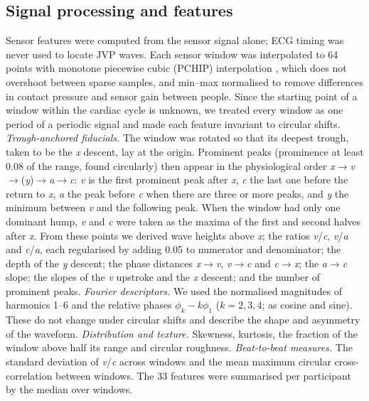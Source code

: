 \documentclass[11pt]{article}
\begin{document}
\subsection*{Signal processing and features}
Sensor features were computed from the sensor signal alone; ECG timing was never used to locate JVP waves. Each sensor window was interpolated to 64 points with monotone piecewise cubic (PCHIP) interpolation \cite{fritsch1980monotone}, which does not overshoot between sparse samples, and min--max normalised to remove differences in contact pressure and sensor gain between people. Since the starting point of a window within the cardiac cycle is unknown, we treated every window as one period of a periodic signal and made each feature invariant to circular shifts. \textit{Trough-anchored fiducials.} The window was rotated so that its deepest trough, taken to be the \textit{x} descent, lay at the origin. Prominent peaks (prominence at least 0.08 of the range, found circularly) then appear in the physiological order \textit{x}$\to$\textit{v}$\to$(\textit{y})$\to$\textit{a}$\to$\textit{c}: \textit{v} is the first prominent peak after \textit{x}, \textit{c} the last one before the return to \textit{x}, \textit{a} the peak before \textit{c} when there are three or more peaks, and \textit{y} the minimum between \textit{v} and the following peak. When the window had only one dominant hump, \textit{v} and \textit{c} were taken as the maxima of the first and second halves after \textit{x}. From these points we derived wave heights above \textit{x}; the ratios \textit{v}/\textit{c}, \textit{v}/\textit{a} and \textit{c}/\textit{a}, each regularised by adding 0.05 to numerator and denominator; the depth of the \textit{y} descent; the phase distances \textit{x}$\to$\textit{v}, \textit{v}$\to$\textit{c} and \textit{c}$\to$\textit{x}; the \textit{a}$\to$\textit{c} slope; the slopes of the \textit{v} upstroke and the \textit{x} descent; and the number of prominent peaks. \textit{Fourier descriptors.} We used the normalised magnitudes of harmonics 1--6 and the relative phases $\phi_k-k\phi_1$ ($k=2,3,4$; as cosine and sine). These do not change under circular shifts and describe the shape and asymmetry of the waveform. \textit{Distribution and texture.} Skewness, kurtosis, the fraction of the window above half its range and circular roughness. \textit{Beat-to-beat measures.} The standard deviation of \textit{v}/\textit{c} across windows and the mean maximum circular cross-correlation between windows. The 33 features were summarised per participant by the median over windows.
\end{document}

